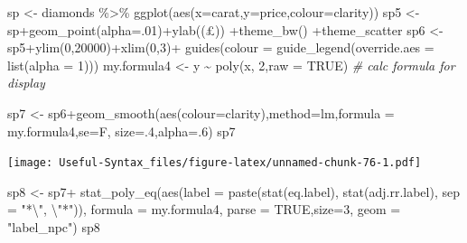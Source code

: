 \documentclass[
]{article}
\newenvironment{Shaded}{\begin{snugshade}}{\end{snugshade}}
\newcommand{\AttributeTok}[1]{\textcolor[rgb]{0.77,0.63,0.00}{#1}}
\newcommand{\CommentTok}[1]{\textcolor[rgb]{0.56,0.35,0.01}{\textit{#1}}}
\newcommand{\ConstantTok}[1]{\textcolor[rgb]{0.00,0.00,0.00}{#1}}
\newcommand{\DecValTok}[1]{\textcolor[rgb]{0.00,0.00,0.81}{#1}}
\newcommand{\FunctionTok}[1]{\textcolor[rgb]{0.00,0.00,0.00}{#1}}
\newcommand{\NormalTok}[1]{#1}
\newcommand{\OtherTok}[1]{\textcolor[rgb]{0.56,0.35,0.01}{#1}}
\newcommand{\SpecialCharTok}[1]{\textcolor[rgb]{0.00,0.00,0.00}{#1}}
\newcommand{\StringTok}[1]{\textcolor[rgb]{0.31,0.60,0.02}{#1}}
\begin{document}
\begin{Shaded}
\begin{Highlighting}[]
\NormalTok{sp }\OtherTok{\textless{}{-}}\NormalTok{ diamonds }\SpecialCharTok{\%\textgreater{}\%} \FunctionTok{ggplot}\NormalTok{(}\FunctionTok{aes}\NormalTok{(}\AttributeTok{x=}\NormalTok{carat,}\AttributeTok{y=}\NormalTok{price,}\AttributeTok{colour=}\NormalTok{clarity))}
\NormalTok{sp5 }\OtherTok{\textless{}{-}}\NormalTok{ sp}\SpecialCharTok{+}\FunctionTok{geom\_point}\NormalTok{(}\AttributeTok{alpha=}\NormalTok{.}\DecValTok{01}\NormalTok{)}\SpecialCharTok{+}\FunctionTok{ylab}\NormalTok{(}\StringTok{\textquotesingle{}(£)\textquotesingle{}}\NormalTok{) }\SpecialCharTok{+}\FunctionTok{theme\_bw}\NormalTok{() }\SpecialCharTok{+}\NormalTok{theme\_scatter}
\NormalTok{sp6 }\OtherTok{\textless{}{-}}\NormalTok{ sp5}\SpecialCharTok{+}\FunctionTok{ylim}\NormalTok{(}\DecValTok{0}\NormalTok{,}\DecValTok{20000}\NormalTok{)}\SpecialCharTok{+}\FunctionTok{xlim}\NormalTok{(}\DecValTok{0}\NormalTok{,}\DecValTok{3}\NormalTok{)}\SpecialCharTok{+} \FunctionTok{guides}\NormalTok{(}\AttributeTok{colour =} \FunctionTok{guide\_legend}\NormalTok{(}\AttributeTok{override.aes =} \FunctionTok{list}\NormalTok{(}\AttributeTok{alpha =} \DecValTok{1}\NormalTok{)))}
\NormalTok{my.formula4 }\OtherTok{\textless{}{-}}\NormalTok{ y }\SpecialCharTok{\textasciitilde{}} \FunctionTok{poly}\NormalTok{(x, }\DecValTok{2}\NormalTok{,}\AttributeTok{raw =} \ConstantTok{TRUE}\NormalTok{) }\CommentTok{\# calc formula for display}

\NormalTok{sp7 }\OtherTok{\textless{}{-}}\NormalTok{ sp6}\SpecialCharTok{+}\FunctionTok{geom\_smooth}\NormalTok{(}\FunctionTok{aes}\NormalTok{(}\AttributeTok{colour=}\NormalTok{clarity),}\AttributeTok{method=}\StringTok{\textquotesingle{}lm\textquotesingle{}}\NormalTok{,}\AttributeTok{formula =}\NormalTok{ my.formula4,}\AttributeTok{se=}\NormalTok{F, }\AttributeTok{size=}\NormalTok{.}\DecValTok{4}\NormalTok{,}\AttributeTok{alpha=}\NormalTok{.}\DecValTok{6}\NormalTok{)}
\NormalTok{sp7}
\end{Highlighting}
\end{Shaded}

\texttt{[image: Useful-Syntax\_files/figure-latex/unnamed-chunk-76-1.pdf]}

\begin{Shaded}
\begin{Highlighting}[]
\NormalTok{sp8 }\OtherTok{\textless{}{-}}\NormalTok{ sp7}\SpecialCharTok{+}
  \FunctionTok{stat\_poly\_eq}\NormalTok{(}\FunctionTok{aes}\NormalTok{(}\AttributeTok{label =}  \FunctionTok{paste}\NormalTok{(}\FunctionTok{stat}\NormalTok{(eq.label),}
                                  \FunctionTok{stat}\NormalTok{(adj.rr.label), }\AttributeTok{sep =} \StringTok{"*}\SpecialCharTok{\textbackslash{}"}\StringTok{, }\SpecialCharTok{\textbackslash{}"}\StringTok{*"}\NormalTok{)),}
               \AttributeTok{formula =}\NormalTok{ my.formula4, }\AttributeTok{parse =} \ConstantTok{TRUE}\NormalTok{,}\AttributeTok{size=}\DecValTok{3}\NormalTok{,  }\AttributeTok{geom =} \StringTok{"label\_npc"}\NormalTok{)}
\NormalTok{sp8}
\end{Highlighting}
\end{Shaded}
\end{document}

